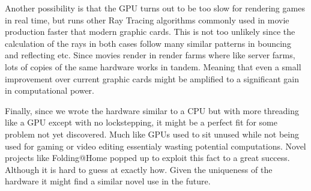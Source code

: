 		Another possibility is that the GPU turns out to be too slow for
		rendering games in real time, but runs other Ray Tracing algorithms
		commonly used in movie production faster that modern graphic cards.
		This is not too unlikely since the calculation of the rays in both
		cases follow many similar patterns in bouncing and reflecting etc.
		Since movies render in render farms where like server farms, lots of
		copies of the same hardware works in tandem. Meaning that even a small
		improvement over current graphic cards might be amplified to a
		significant gain in computational power.

		Finally, since we wrote the hardware similar to a CPU but with more
		threading like a GPU except with no lockstepping, it might be a perfect
		fit for some problem not yet discovered. Much like GPUs used to sit
		unused while not being used for gaming or video editing essentialy
		wasting potential computations. Novel projects like
		Folding@Home\cite{Beberg2009} popped up to exploit this fact to a great
		success. Although it is hard to guess at exactly how. Given the
		uniqueness of the hardware it might find a similar novel use in the
		future.
